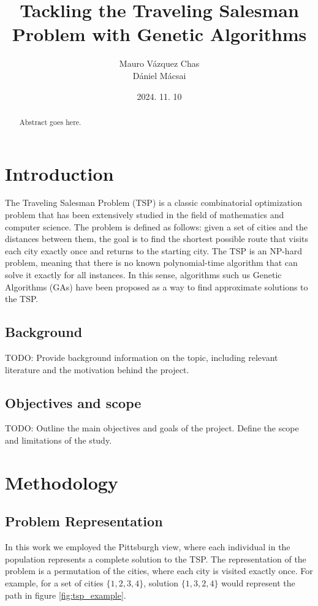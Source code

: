 \documentclass[12pt]{article}
\title{%
    \vspace{2in} %
    \textbf{Tackling the Traveling Salesman Problem with Genetic Algorithms}\\
    \vspace{2in}
}
\author{
    Mauro Vázquez Chas \\
    Dániel Mácsai
    \vspace{0.2in}
}
\date{2024. 11. 10}
\begin{document}
\maketitle
\thispagestyle{empty}

\begin{abstract}
    \noindent
    Abstract goes here.
\end{abstract}

\newpage

\tableofcontents
\newpage




\section{Introduction}
The Traveling Salesman Problem (TSP) is a classic combinatorial optimization problem that has been extensively studied in the field of mathematics and computer science. The problem is defined as follows: given a set of cities and the distances between them, the goal is to find the shortest possible route that visits each city exactly once and returns to the starting city. The TSP is an NP-hard problem, meaning that there is no known polynomial-time algorithm that can solve it exactly for all instances. In this sense, algorithms such us Genetic Algorithms (GAs) have been proposed as a way to find approximate solutions to the TSP.


\subsection{Background}
TODO: Provide background information on the topic, including relevant literature and the motivation behind the project.

\subsection{Objectives and scope}
TODO: Outline the main objectives and goals of the project. Define the scope and limitations of the study.



\section{Methodology}
\subsection{Problem Representation}
In this work we employed the Pittsburgh view, where each individual in the population represents a complete solution to the TSP. The representation of the problem is a permutation of the cities, where each city is visited exactly once. For example, for a set of cities $\{1,2,3,4\}$, solution $\{1,3,2,4\}$ would represent the path in figure \ref{fig:tsp_example}.
\end{document}

